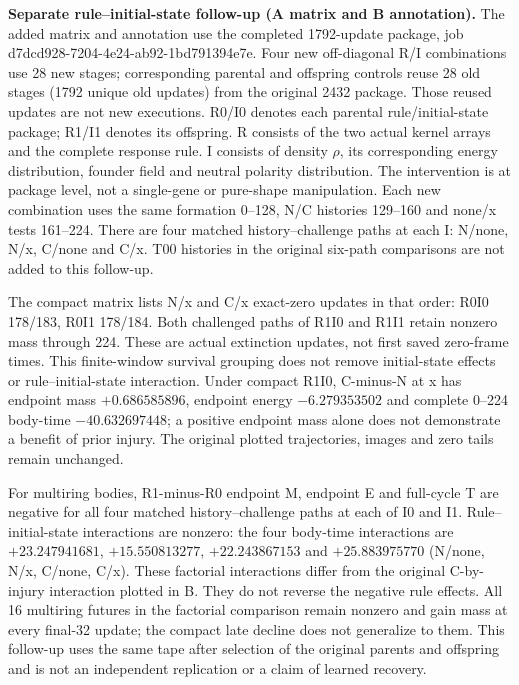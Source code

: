 \textbf{Separate rule--initial-state follow-up (A matrix and B annotation).} The added matrix and annotation use the completed 1792-update package, job d7dcd928-7204-4e24-ab92-1bd791394e7e. Four new off-diagonal R/I combinations use 28 new stages; corresponding parental and offspring controls reuse 28 old stages (1792 unique old updates) from the original 2432 package. Those reused updates are not new executions. R0/I0 denotes each parental rule/initial-state package; R1/I1 denotes its offspring. R consists of the two actual kernel arrays and the complete response rule. I consists of density $\rho$, its corresponding energy distribution, founder field and neutral polarity distribution. The intervention is at package level, not a single-gene or pure-shape manipulation. Each new combination uses the same formation 0--128, N/C histories 129--160 and none/x tests 161--224. There are four matched history--challenge paths at each I: N/none, N/x, C/none and C/x. T00 histories in the original six-path comparisons are not added to this follow-up.

The compact matrix lists N/x and C/x exact-zero updates in that order: R0I0 178/183, R0I1 178/184. Both challenged paths of R1I0 and R1I1 retain nonzero mass through 224. These are actual extinction updates, not first saved zero-frame times. This finite-window survival grouping does not remove initial-state effects or rule--initial-state interaction. Under compact R1I0, C-minus-N at x has endpoint mass $+0.686585896$, endpoint energy $-6.279353502$ and complete 0--224 body-time $-40.632697448$; a positive endpoint mass alone does not demonstrate a benefit of prior injury. The original plotted trajectories, images and zero tails remain unchanged.

For multiring bodies, R1-minus-R0 endpoint M, endpoint E and full-cycle T are negative for all four matched history--challenge paths at each of I0 and I1. Rule--initial-state interactions are nonzero: the four body-time interactions are $+23.247941681$, $+15.550813277$, $+22.243867153$ and $+25.883975770$ (N/none, N/x, C/none, C/x). These factorial interactions differ from the original C-by-injury interaction plotted in B. They do not reverse the negative rule effects. All 16 multiring futures in the factorial comparison remain nonzero and gain mass at every final-32 update; the compact late decline does not generalize to them. This follow-up uses the same tape after selection of the original parents and offspring and is not an independent replication or a claim of learned recovery.

